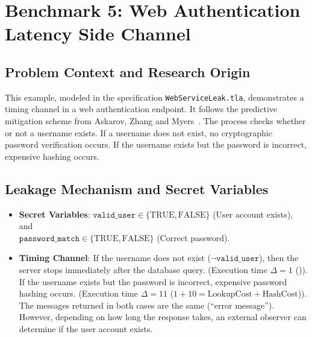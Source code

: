 \documentclass[a4paper,12pt]{report}
\begin{document}
\section{Benchmark 5: Web Authentication Latency Side Channel}

\subsection{Problem Context and Research Origin}
This example, modeled in the specification \texttt{WebServiceLeak.tla}, demonstrates a timing channel in a web authentication endpoint. It follows the predictive mitigation scheme from Askarov, Zhang and Myers~\cite{askarov2010predictive}. The process checks whether or not a username exists. If a username does not exist, no cryptographic password verification occurs. If the username exists but the password is incorrect, expensive hashing occurs.

\subsection{Leakage Mechanism and Secret Variables}
\begin{itemize}[itemsep=0.1em, topsep=0.1em]
    \item \textbf{Secret Variables}: $\texttt{valid\_user} \in \{\text{TRUE}, \text{FALSE}\}$ (User account exists), and\\ $\texttt{password\_match} \in \{\text{TRUE}, \text{FALSE}\}$ (Correct password).
    \item \textbf{Timing Channel}: If the username does not exist ($\neg\texttt{valid\_user}$), then the server stops immediately after the database query. (Execution time $\Delta = 1$ ()). If the username exists but the password is incorrect, expensive password hashing occurs. (Execution time $\Delta = 11$ ($1 + 10 = \text{LookupCost} + \text{HashCost}$)). The messages returned in both cases are the same (``error message''). However, depending on how long the response takes, an external observer can determine if the user account exists.
\end{itemize}
\end{document}
